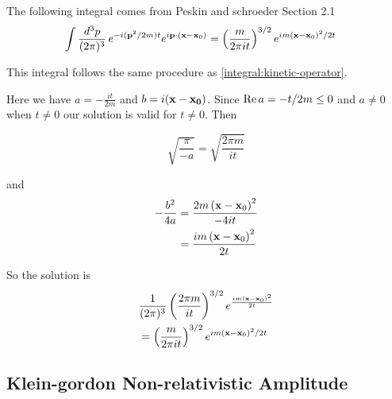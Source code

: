 The following integral comes from Peskin and schroeder Section 2.1
\begin{align}
\int \frac{d^3p}{(2\pi)^3} \, e^{-i(\boldsymbol{\mathbf{p}}^2/2m)t} e^{i\boldsymbol{\mathbf{p}}\cdot(\boldsymbol{\mathbf{x}}-\boldsymbol{\mathbf{x}}_0)}
&= \left( \frac{m}{2\pi i t} \right)^{3/2} e^{im (\boldsymbol{\mathbf{x}}-\boldsymbol{\mathbf{x}}_0)^2 /2t}
\end{align}

This integral follows the same procedure as \ref{integral:kinetic-operator}.

Here we have $a = -\frac{it}{2m}$ and $b = i(\boldsymbol{\mathbf{x}}-\boldsymbol{\mathbf{x_0}})$.
Since $\operatorname{Re}{a} = -t/2m \leq 0$ and $a\neq 0$ when $t\neq 0$ our solution is valid for $t\neq 0$.
Then

$$
\sqrt{ \frac{\pi}{-a} } = \sqrt{ \frac{2\pi m}{it} }
$$

and
\begin{align*}
-\frac{b^2}{4a} &= \frac{2m \left(\boldsymbol{\mathbf{x}}-\boldsymbol{\mathbf{x}}_0\right)^2}{-4it} \\
&= \frac{im \left(\boldsymbol{\mathbf{x}}-\boldsymbol{\mathbf{x}}_0\right)^2}{2t}
\end{align*}

So the solution is
\begin{align*}
& \frac{1}{(2\pi)^3} \left( \frac{2\pi m}{it} \right)^{3/2} e^{\frac{im \left(\boldsymbol{\mathbf{x}}-\boldsymbol{\mathbf{x}}_0\right)^2}{2t}} \\
&= \left( \frac{m}{2\pi it} \right)^{3/2} e^{im \left(\boldsymbol{\mathbf{x}}-\boldsymbol{\mathbf{x}}_0\right)^2 /2t}
\end{align*}







\subsection{Klein-gordon Non-relativistic Amplitude}